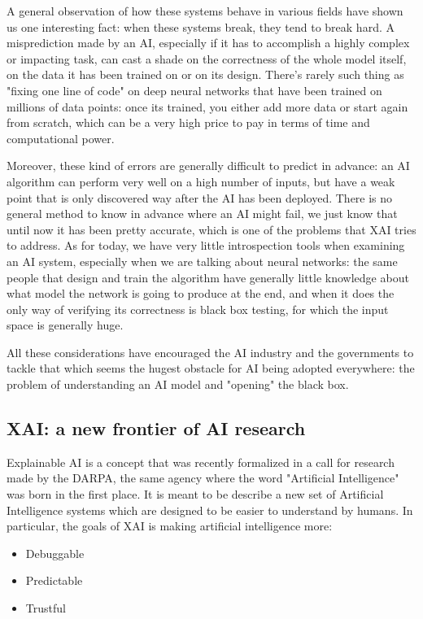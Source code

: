 \documentclass{article}
\newcommand{\note}{\todo[]}
\begin{document}
A general observation of how these systems behave in various fields have shown us one interesting fact: when these systems break, they tend to break hard.
A misprediction made by an AI, especially if it has to accomplish a highly
complex or impacting task, can cast a shade on the correctness of the whole
model itself, on the data it has been trained on or on its design. There's
rarely such thing as "fixing one line of code" on deep neural networks that have
been trained on millions of data points: once its trained, you either add more data or start again from scratch, which can be a very high price to pay in terms of time and computational power.

Moreover, these kind of errors are generally difficult to predict
in advance: an AI algorithm can perform very well on a high number of inputs,
but have a weak point that is only discovered way after the AI has been
deployed. There is no general method to know in advance where an AI might fail,
we just know that until now it has been pretty accurate, which is one of the problems that XAI tries to address. As for today, we have very little introspection tools when
examining an AI system, especially when we are talking about neural networks:
the same people that design and train the algorithm have generally little
knowledge about what model the network is going to produce at the end, and when
it does the only way of verifying its correctness is black box testing, for
which the input space is generally huge.

All these considerations have encouraged the AI industry and the governments to
tackle that which seems the hugest obstacle for AI being adopted everywhere: the
problem of understanding an AI model and "opening" the black box.

\subsection{XAI: a new frontier of AI research}

Explainable AI is a concept that was recently formalized in a call for research
\note{cit} made by the DARPA, the same agency where the word "Artificial
Intelligence" was born in the first place. It is meant to be describe a new set
of Artificial Intelligence systems which are designed to be easier to understand
by humans. In particular, the goals of XAI is making artificial intelligence
more:

\begin{itemize}
    \item Debuggable
    \item Predictable
    \item Trustful
\end{itemize}
\end{document}
